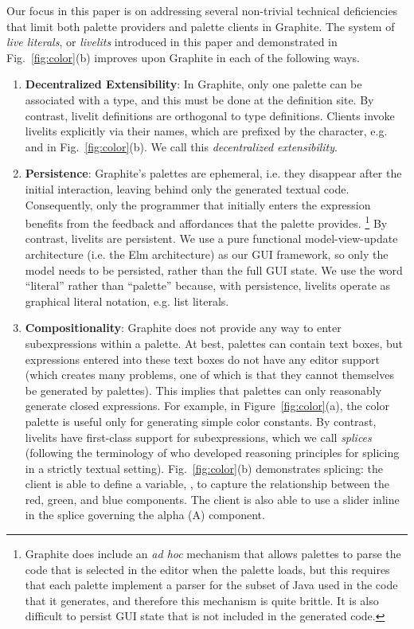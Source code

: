 Our focus in this paper is on addressing several non-trivial technical
deficiencies that limit both palette providers and palette clients in Graphite.
The system of \emph{live literals}, or \emph{livelits} introduced in
this paper and demonstrated in Fig.~\ref{fig:color}(b) improves upon Graphite
in each of the following ways.
\begin{enumerate}
  \setlength\itemsep{0.5em}
  \item \textbf{Decentralized Extensibility}:
    In Graphite, only one palette can be associated with a type, and this must
    be done at the definition site.
    By contrast, livelit definitions are orthogonal to type definitions.
    Clients invoke livelits explicitly via their names, which are prefixed by the \li{\$} character,
    e.g.  and  in Fig.~\ref{fig:color}(b).
    We call this \emph{decentralized extensibility}.
  \item \textbf{Persistence}: Graphite's palettes are {ephemeral},
  i.e. they disappear after the initial interaction,
  leaving behind only the generated textual code.
  Consequently, only the programmer that initially enters the expression
  benefits from the feedback and affordances that the palette provides.%
  \footnote{Graphite does include an \emph{ad hoc} mechanism that
  allows palettes to parse the code that is selected in the editor
  when the palette loads, but this requires that each palette implement
  a parser for the subset of Java used in the code that it generates,
  and therefore this mechanism is quite brittle. It is also difficult
  to persist GUI state that is not included in the generated code.}
  By contrast, livelits are persistent. We use a pure functional model-view-update architecture
  (i.e. the Elm architecture) as our GUI framework,
  so only the model needs to be persisted, rather than the full GUI state.
  We use the word ``literal'' rather than ``palette'' because, with persistence, livelits
  operate as graphical literal notation, e.g. list literals.

  \item \textbf{Compositionality}:
  Graphite does not provide any way to {enter subexpressions within a palette}.
  At best, palettes can contain text boxes, but expressions entered into these text boxes
  do not have any editor support (which creates many problems, one of which is that they cannot themselves be generated by palettes).
  This implies that palettes can only reasonably generate {closed expressions}.
  For example, in Figure~\ref{fig:color}(a), the color palette
  is useful only for generating simple color constants.
  By contrast, livelits have first-class support for subexpressions, which we call \emph{splices} (following
  the terminology of \citet{TLMs} who developed reasoning principles for splicing in a strictly textual setting).
  Fig.~\ref{fig:color}(b) demonstrates splicing: the client is able to define a variable, ,
  to capture the relationship between the red, green, and blue components.
  The client is also able to use a slider inline in the splice governing
  the alpha (A) component.


\end{enumerate}
